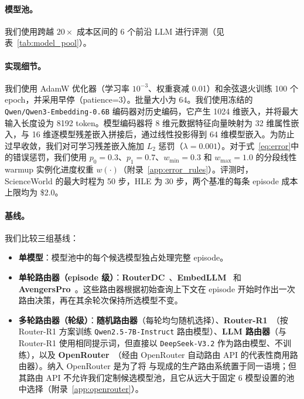 

\paragraph{模型池。}
我们使用跨越 $20\times$ 成本区间的 6 个前沿 LLM 进行评测（见表~\ref{tab:model_pool}）。



\paragraph{实现细节。}
我们使用 AdamW 优化器（学习率 $10^{-3}$、权重衰减 0.01）和余弦退火训练 100 个 epoch，并采用早停（patience=3）。批量大小为 64。我们使用冻结的 \texttt{Qwen/Qwen3-Embedding-0.6B} 编码器对历史编码，它产生 1024 维嵌入，并将最大输入长度设为 8192 token。模型编码器将 8 维元数据特征向量映射为 32 维属性嵌入，与 16 维逐模型残差嵌入拼接后，通过线性投影得到 64 维模型嵌入。为防止过早收敛，我们对可学习残差嵌入施加 $L_2$ 惩罚（$\lambda=0.001$）。对于式~\ref{eq:error}中的错误惩罚，我们使用 $p_0{=}0.3$、$p_1{=}0.7$、$w_{\min}{=}0.3$ 和 $w_{\max}{=}1.0$ 的分段线性 warmup 实例化进度权重 $w(\cdot)$（附录~\ref{app:error_rules}）。评测时，ScienceWorld 的最大时程为 50 步，HLE 为 30 步，两个基准的每条 episode 成本上限均为 \$2.0。



\paragraph{基线。}
我们比较三组基线：
\begin{itemize}[nolistsep, noitemsep, leftmargin=*]
\item \textbf{单模型}：模型池中的每个候选模型独占处理完整 episode。
\item \textbf{单轮路由器（episode 级）}：\textbf{RouterDC}~\citep{chen2024routerdc}、\textbf{EmbedLLM}~\citep{wang2024embedllm} 和 \textbf{AvengersPro}~\citep{zhang2025avengers, zhang2025beyond}。这些路由器根据初始查询上下文在 episode 开始时作出一次路由决策，再在其余轮次保持所选模型不变。
\item \textbf{多轮路由器（轮级）}：\textbf{随机路由器}（每轮均匀随机选择）、\textbf{Router-R1}~\citep{zhang2025router}（按 Router-R1 方案训练 \texttt{Qwen2.5-7B-Instruct} 路由模型）、\textbf{LLM 路由器}（与 Router-R1 使用相同提示词，但直接以 \texttt{DeepSeek-V3.2} 作为路由模型、不训练），以及 \textbf{OpenRouter}~\citep{openrouter}（经由 OpenRouter 自动路由 API 的代表性商用路由器）。纳入 OpenRouter 是为了将 \method 与现成的生产路由系统置于同一语境；但其路由 API 不允许我们定制候选模型池，且它从远大于固定 6 模型设置的池中选择（附录~\ref{app:openrouter}）。
\end{itemize}

